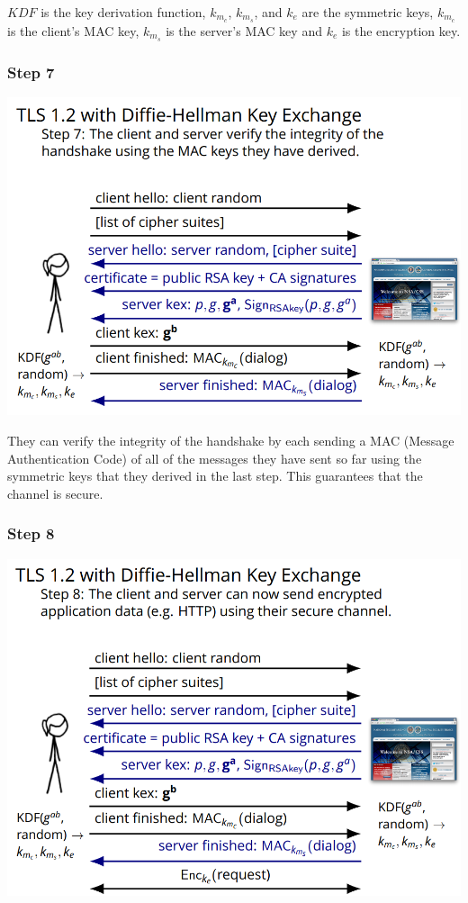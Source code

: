 \documentclass[11pt]{article} %
\begin{document}
\noindent $KDF$ is the key derivation function,
$k_{m_c}$, $k_{m_s}$, and $k_{e}$ are the symmetric keys,
$k_{m_c}$ is the client's MAC key, $k_{m_s}$ is the server's MAC key and $k_{e}$ 
is the encryption key.

\subsubsection{Step 7}

\begin{center}
	\includegraphics[scale=.8]{./DiffieStep7.png}
\end{center}

\noindent They can verify the integrity of the handshake by each sending a MAC (Message 
Authentication Code) of all of the messages they have sent so far using the 
symmetric keys that they derived in the last step. This guarantees that the channel is secure.

\subsubsection{Step 8}

\begin{center}
	\includegraphics[scale=.8]{./DiffieStep8.png}
\end{center}
\end{document}

